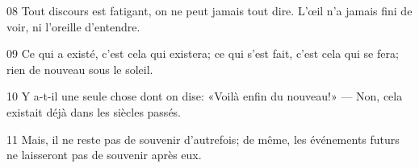 
08 Tout discours est fatigant, on ne peut jamais tout dire. L’œil n’a jamais fini de voir, ni l’oreille d’entendre.

09 Ce qui a existé, c’est cela qui existera; ce qui s’est fait, c’est cela qui se fera; rien de nouveau sous le soleil.

10 Y a-t-il une seule chose dont on dise: «Voilà enfin du nouveau!» --- Non, cela existait déjà dans les siècles passés.

11 Mais, il ne reste pas de souvenir d’autrefois; de même, les événements futurs ne laisseront pas de souvenir après eux.
